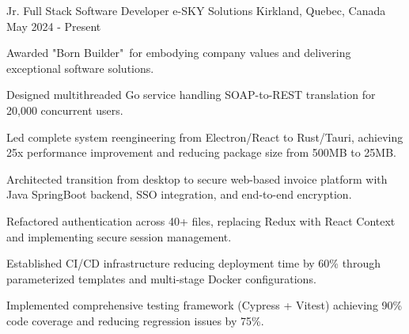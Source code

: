 

\begin{cventries}

  \cventry
   {Jr. Full Stack Software Developer} %
    {e-SKY Solutions} %
    {Kirkland, Quebec, Canada} %
    {May 2024 - Present} %
    {
      \begin{cvitems} %
        \item {Awarded "Born Builder" for embodying company values and delivering exceptional software solutions.}
        \item {Designed multithreaded Go service handling SOAP-to-REST translation for 20,000 concurrent users.}
        \item {Led complete system reengineering from Electron/React to Rust/Tauri, achieving 25x performance improvement and reducing package size from 500MB to 25MB.}
        \item {Architected transition from desktop to secure web-based invoice platform with Java SpringBoot backend, SSO integration, and end-to-end encryption.}
        \item {Refactored authentication across 40+ files, replacing Redux with React Context and implementing secure session management.}
        \item {Established CI/CD infrastructure reducing deployment time by 60\% through parameterized templates and multi-stage Docker configurations.}
        \item {Implemented comprehensive testing framework (Cypress + Vitest) achieving 90\% code coverage and reducing regression issues by 75\%.}
      \end{cvitems}
    }
    


\end{cventries}
